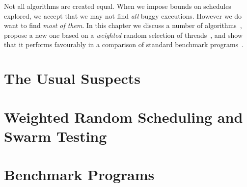 \chapstart Not all algorithms are created equal.
When we impose bounds on schedules explored, we accept that we may not find \emph{all} buggy
executions.  However we do want to find \emph{most of them}.  In this chapter we discuss a number of
algorithms~, propose a new one based on a \emph{weighted} random selection of
threads~, and show that it performs favourably in a comparison of standard
benchmark programs~.

\section{The Usual Suspects}
\label{sec:algorithms-usual}

\blindtext

\section{Weighted Random Scheduling and Swarm Testing}
\label{sec:algorithms-swarm}

\blindtext

\section{Benchmark Programs}
\label{sec:algorithms-sctbench}

\blindtext
